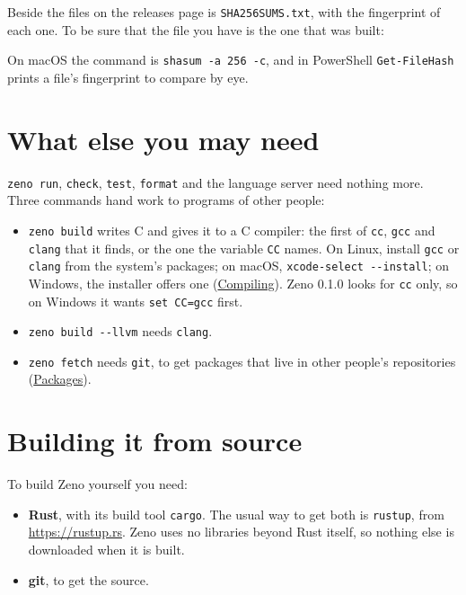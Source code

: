 Beside the files on the releases page is \verb|SHA256SUMS.txt|, with
the fingerprint of each one. To be sure that the file you have is the
one that was built:


On macOS the command is \verb|shasum -a 256 -c|, and in PowerShell
\verb|Get-FileHash| prints a file's fingerprint to compare by eye.

\section{What else you may need}

\verb|zeno run|, \verb|check|, \verb|test|, \verb|format| and the
language server need nothing more. Three commands hand work to
programs of other people:

\begin{itemize}
\item \verb|zeno build| writes C and gives it to a C compiler: the first of
  \verb|cc|, \verb|gcc| and \verb|clang| that it finds, or the one the
  variable \verb|CC| names. On Linux, install \verb|gcc| or
  \verb|clang| from the system's packages; on macOS,
  \verb|xcode-select --install|; on Windows, the installer offers one
  (\hyperref[ch-compiling]{Compiling}). Zeno 0.1.0 looks for \verb|cc|
  only, so on Windows it wants \verb|set CC=gcc| first.
\item \verb|zeno build --llvm| needs \verb|clang|.
\item \verb|zeno fetch| needs \verb|git|, to get packages that live in
  other people's repositories (\hyperref[ch-packages]{Packages}).
\end{itemize}

\section{Building it from source}

To build Zeno yourself you need:

\begin{itemize}
\item \textbf{Rust}, with its build tool \verb|cargo|. The usual way
  to get both is \verb|rustup|, from \url{https://rustup.rs}. Zeno
  uses no libraries beyond Rust itself, so nothing else is
  downloaded when it is built.
\item \textbf{git}, to get the source.
\end{itemize}

